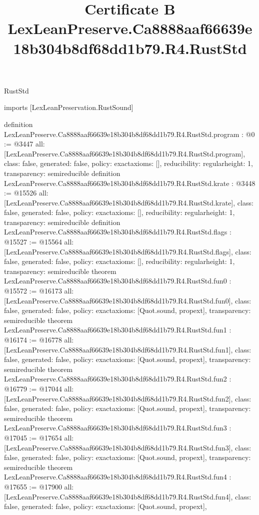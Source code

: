 \begin{lexlean}{RustStd}
\title{Certificate B LexLeanPreserve.Ca8888aaf66639e18b304b8df68dd1b79.R4.RustStd}
\begin{coremodule}
imports [LexLeanPreservation.RustSound]

definition LexLeanPreserve.Ca8888aaf66639e18b304b8df68dd1b79.R4.RustStd.program : @0 := @3447 {
  all: [LexLeanPreserve.Ca8888aaf66639e18b304b8df68dd1b79.R4.RustStd.program],
  class: false,
  generated: false,
  policy: exact{axioms: []},
  reducibility: regular{height: 1},
  transparency: semireducible
}
definition LexLeanPreserve.Ca8888aaf66639e18b304b8df68dd1b79.R4.RustStd.krate : @3448 := @15526 {
  all: [LexLeanPreserve.Ca8888aaf66639e18b304b8df68dd1b79.R4.RustStd.krate],
  class: false,
  generated: false,
  policy: exact{axioms: []},
  reducibility: regular{height: 1},
  transparency: semireducible
}
definition LexLeanPreserve.Ca8888aaf66639e18b304b8df68dd1b79.R4.RustStd.flags : @15527 := @15564 {
  all: [LexLeanPreserve.Ca8888aaf66639e18b304b8df68dd1b79.R4.RustStd.flags],
  class: false,
  generated: false,
  policy: exact{axioms: []},
  reducibility: regular{height: 1},
  transparency: semireducible
}
theorem LexLeanPreserve.Ca8888aaf66639e18b304b8df68dd1b79.R4.RustStd.fun0 : @15572 := @16173 {
  all: [LexLeanPreserve.Ca8888aaf66639e18b304b8df68dd1b79.R4.RustStd.fun0],
  class: false,
  generated: false,
  policy: exact{axioms: [Quot.sound, propext]},
  transparency: semireducible
}
theorem LexLeanPreserve.Ca8888aaf66639e18b304b8df68dd1b79.R4.RustStd.fun1 : @16174 := @16778 {
  all: [LexLeanPreserve.Ca8888aaf66639e18b304b8df68dd1b79.R4.RustStd.fun1],
  class: false,
  generated: false,
  policy: exact{axioms: [Quot.sound, propext]},
  transparency: semireducible
}
theorem LexLeanPreserve.Ca8888aaf66639e18b304b8df68dd1b79.R4.RustStd.fun2 : @16779 := @17044 {
  all: [LexLeanPreserve.Ca8888aaf66639e18b304b8df68dd1b79.R4.RustStd.fun2],
  class: false,
  generated: false,
  policy: exact{axioms: [Quot.sound, propext]},
  transparency: semireducible
}
theorem LexLeanPreserve.Ca8888aaf66639e18b304b8df68dd1b79.R4.RustStd.fun3 : @17045 := @17654 {
  all: [LexLeanPreserve.Ca8888aaf66639e18b304b8df68dd1b79.R4.RustStd.fun3],
  class: false,
  generated: false,
  policy: exact{axioms: [Quot.sound, propext]},
  transparency: semireducible
}
theorem LexLeanPreserve.Ca8888aaf66639e18b304b8df68dd1b79.R4.RustStd.fun4 : @17655 := @17900 {
  all: [LexLeanPreserve.Ca8888aaf66639e18b304b8df68dd1b79.R4.RustStd.fun4],
  class: false,
  generated: false,
  policy: exact{axioms: [Quot.sound, propext]},
}
\end{coremodule}
\end{lexlean}
